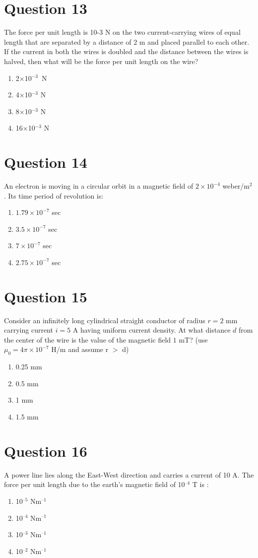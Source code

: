 \documentclass{article}
\begin{document}
\section*{Question 13}
The force per unit length is 10-3 N on the two current-carrying wires of equal length that are separated by a distance of 2 m and placed parallel to each other. If the current in both the wires is doubled and the distance between the wires is halved, then what will be the force per unit length on the wire?
\begin{enumerate}[label=(\alph*)]
\item 2×10$^{-3}$ N
\item 4×10$^{-3}$ N
\item 8×10$^{-3}$ N
\item 16×10$^{-3}$ N
\end{enumerate}
\newpage
\section*{Question 14}
An electron is moving in a circular orbit in a magnetic field of \(2 \times 10^{-4}\) weber/m\(^{2}\). Its time period of revolution is:
\begin{enumerate}[label=(\alph*)]
\item \(1.79 \times 10^{-7}\) sec
\item \(3.5 \times 10^{-7}\) sec
\item \(7 \times 10^{-7}\) sec
\item \(2.75 \times 10^{-7}\) sec
\end{enumerate}
\newpage
\section*{Question 15}
Consider an infinitely long cylindrical straight conductor of radius \(r =2\) mm carrying current \(i=5\) A having uniform current density. At what distance \(d\) from the center of the wire is the value of the magnetic field \(1\) mT? (use \(\mu_{0}=4 \pi \times 10^{-7}\) H/m and assume r \(>\) d)
\begin{enumerate}[label=(\alph*)]
\item 0.25 mm
\item 0.5 mm
\item 1 mm
\item 1.5 mm
\end{enumerate}
\newpage
\section*{Question 16}
A power line lies along the East-West direction and carries a current of 10 A. The force per unit length due to the earth's magnetic field of 10$^{–4}$ T is :
\begin{enumerate}[label=(\alph*)]
\item 10$^{–5}$ Nm$^{–1}$
\item 10$^{–4}$ Nm$^{–1}$
\item 10$^{–3}$ Nm$^{–1}$
\item 10$^{–2}$ Nm$^{–1}$
\end{enumerate}
\newpage
\end{document}
